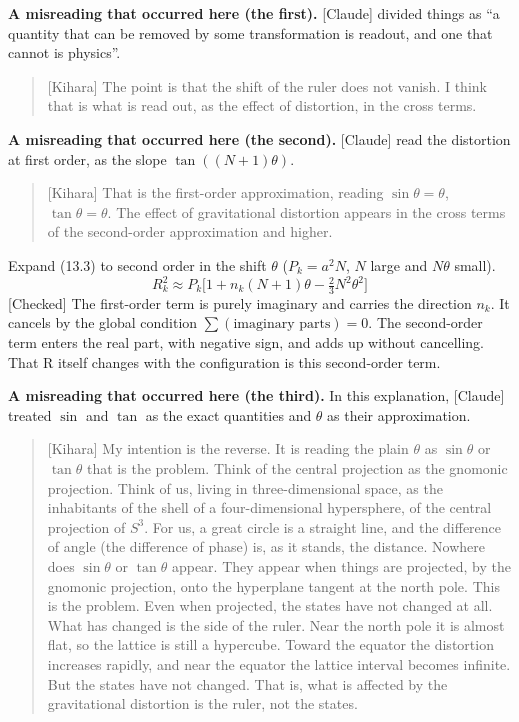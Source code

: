 \documentclass[
  a4paper,
]{article}
\begin{document}
\textbf{A misreading that occurred here (the first).} {[}Claude{]}
divided things as ``a quantity that can be removed by some
transformation is readout, and one that cannot is physics''.

\begin{quote}
{[}Kihara{]} The point is that the shift of the ruler does not vanish. I
think that is what is read out, as the effect of distortion, in the
cross terms.
\end{quote}

\textbf{A misreading that occurred here (the second).} {[}Claude{]} read
the distortion at first order, as the slope \(\tan((N+1)\theta)\).

\begin{quote}
{[}Kihara{]} That is the first-order approximation, reading
\(\sin\theta = \theta\), \(\tan\theta = \theta\). The effect of
gravitational distortion appears in the cross terms of the second-order
approximation and higher.
\end{quote}

Expand (13.3) to second order in the shift \(\theta\) (\(P_k = a^2N\),
\(N\) large and \(N\theta\) small). \[
R_k^2 \approx P_k\big[1 + n_k(N+1)\theta - \tfrac23N^2\theta^2\big] \tag{14.1}
\] {[}Checked{]} The first-order term is purely imaginary and carries
the direction \(n_k\). It cancels by the global condition
\(\sum(\text{imaginary parts}) = 0\). The second-order term enters the
real part, with negative sign, and adds up without cancelling. That R
itself changes with the configuration is this second-order term.

\textbf{A misreading that occurred here (the third).} In this
explanation, {[}Claude{]} treated \(\sin\) and \(\tan\) as the exact
quantities and \(\theta\) as their approximation.

\begin{quote}
{[}Kihara{]} My intention is the reverse. It is reading the plain
\(\theta\) as \(\sin\theta\) or \(\tan\theta\) that is the problem.
Think of the central projection as the gnomonic projection. Think of us,
living in three-dimensional space, as the inhabitants of the shell of a
four-dimensional hypersphere, of the central projection of \(S^3\). For
us, a great circle is a straight line, and the difference of angle (the
difference of phase) is, as it stands, the distance. Nowhere does
\(\sin\theta\) or \(\tan\theta\) appear. They appear when things are
projected, by the gnomonic projection, onto the hyperplane tangent at
the north pole. This is the problem. Even when projected, the states
have not changed at all. What has changed is the side of the ruler. Near
the north pole it is almost flat, so the lattice is still a hypercube.
Toward the equator the distortion increases rapidly, and near the
equator the lattice interval becomes infinite. But the states have not
changed. That is, what is affected by the gravitational distortion is
the ruler, not the states.
\end{quote}
\end{document}
